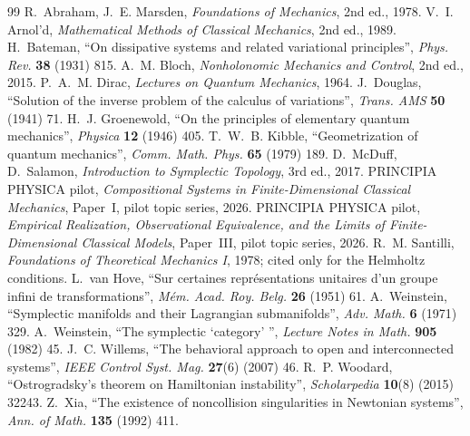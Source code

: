 \documentclass[12pt,a4paper]{article}
\theoremstyle{definition}
\theoremstyle{plain}
\theoremstyle{commentary}
\begin{document}
\begin{thebibliography}{99}\small\itemsep0pt
 R.~Abraham, J.~E. Marsden, \emph{Foundations of Mechanics}, 2nd ed., 1978.
 V.~I. Arnol'd, \emph{Mathematical Methods of Classical Mechanics}, 2nd ed., 1989.
 H.~Bateman, ``On dissipative systems and related variational principles'', \emph{Phys. Rev.} \textbf{38} (1931) 815.
 A.~M. Bloch, \emph{Nonholonomic Mechanics and Control}, 2nd ed., 2015.
 P.~A.~M. Dirac, \emph{Lectures on Quantum Mechanics}, 1964.
 J.~Douglas, ``Solution of the inverse problem of the calculus of variations'', \emph{Trans. AMS} \textbf{50} (1941) 71.
 H.~J. Groenewold, ``On the principles of elementary quantum mechanics'', \emph{Physica} \textbf{12} (1946) 405.
 T.~W.~B. Kibble, ``Geometrization of quantum mechanics'', \emph{Comm. Math. Phys.} \textbf{65} (1979) 189.
 D.~McDuff, D.~Salamon, \emph{Introduction to Symplectic Topology}, 3rd ed., 2017.
 PRINCIPIA PHYSICA pilot, \emph{Compositional Systems in Finite-Dimensional Classical Mechanics}, Paper~I, pilot topic series, 2026.
 PRINCIPIA PHYSICA pilot, \emph{Empirical Realization, Observational Equivalence, and the Limits of Finite-Dimensional Classical Models}, Paper~III, pilot topic series, 2026.
 R.~M. Santilli, \emph{Foundations of Theoretical Mechanics I}, 1978; cited only for the Helmholtz conditions.
 L.~van Hove, ``Sur certaines repr\'esentations unitaires d'un groupe infini de transformations'', \emph{M\'em. Acad. Roy. Belg.} \textbf{26} (1951) 61.
 A.~Weinstein, ``Symplectic manifolds and their Lagrangian submanifolds'', \emph{Adv. Math.} \textbf{6} (1971) 329.
 A.~Weinstein, ``The symplectic `category' '', \emph{Lecture Notes in Math.} \textbf{905} (1982) 45.
 J.~C. Willems, ``The behavioral approach to open and interconnected systems'', \emph{IEEE Control Syst. Mag.} \textbf{27}(6) (2007) 46.
 R.~P. Woodard, ``Ostrogradsky's theorem on Hamiltonian instability'', \emph{Scholarpedia} \textbf{10}(8) (2015) 32243.
 Z.~Xia, ``The existence of noncollision singularities in Newtonian systems'', \emph{Ann. of Math.} \textbf{135} (1992) 411.
\end{thebibliography}
\end{document}
